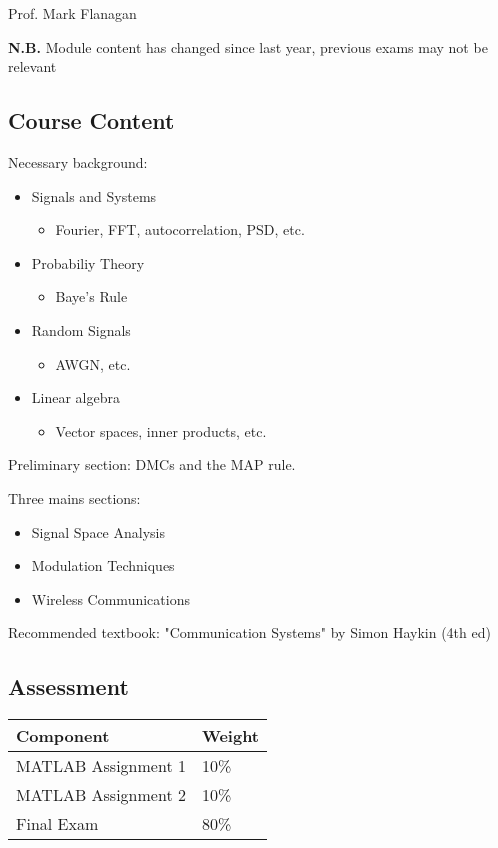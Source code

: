 \documentclass[12pt]{article}
\begin{document}
\begin{flushright}[Lecture on 1.1]\end{flushright}

Prof. Mark Flanagan

\textbf{N.B.} Module content has changed since last year, previous exams may not be relevant

\subsection{Course Content}
Necessary background:
\begin{itemize}[noitemsep]
    \item Signals and Systems
    \begin{itemize}[noitemsep]
        \item Fourier, FFT, autocorrelation, PSD, etc.
    \end{itemize}
    \item Probabiliy Theory
    \begin{itemize}[noitemsep]
        \item Baye's Rule
    \end{itemize}
    \item Random Signals
    \begin{itemize}[noitemsep]
        \item AWGN, etc.
    \end{itemize}
    \item Linear algebra
    \begin{itemize}[noitemsep]
        \item Vector spaces, inner products, etc.
    \end{itemize}
\end{itemize}

Preliminary section: DMCs and the MAP rule.

Three mains sections:
\begin{itemize}[noitemsep]
    \item Signal Space Analysis
    \item Modulation Techniques
    \item Wireless Communications
\end{itemize}

Recommended textbook: "Communication Systems" by Simon Haykin (4th ed)

\subsection{Assessment}
    \begin{tabular}{ |l l| }
        \hline
        \textbf{Component} & \textbf{Weight} \\ \hline
        MATLAB Assignment 1   & 10\% \\ \hline
        MATLAB Assignment 2   & 10\% \\ \hline
        Final Exam            & 80\% \\ \hline
    \end{tabular}
\end{document}
